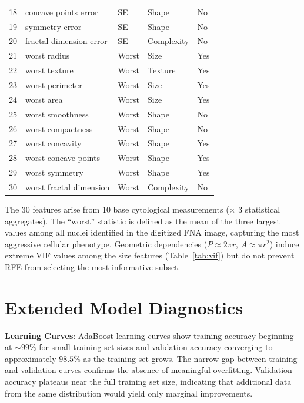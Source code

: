 \documentclass[10pt,letterpaper]{article}
\begin{document}
\begin{table}[h]
\begin{tabular}{rllll}
18 & concave points error    & SE   & Shape     & No  \\
19 & symmetry error          & SE   & Shape     & No  \\
20 & fractal dimension error & SE   & Complexity & No \\
21 & worst radius            & Worst & Size     & Yes \\
22 & worst texture           & Worst & Texture  & Yes \\
23 & worst perimeter         & Worst & Size     & Yes \\
24 & worst area              & Worst & Size     & Yes \\
25 & worst smoothness        & Worst & Shape    & No  \\
26 & worst compactness       & Worst & Shape    & No  \\
27 & worst concavity         & Worst & Shape    & Yes \\
28 & worst concave points    & Worst & Shape    & Yes \\
29 & worst symmetry          & Worst & Shape    & Yes \\
30 & worst fractal dimension & Worst & Complexity & No \\
\bottomrule
\end{tabular}
\end{table}

The 30 features arise from 10 base cytological measurements ($\times$ 3 statistical aggregates).
The ``worst'' statistic is defined as the mean of the three largest values among all nuclei
identified in the digitized FNA image, capturing the most aggressive cellular phenotype.
Geometric dependencies ($P \approx 2\pi r$, $A \approx \pi r^2$) induce extreme VIF values
among the size features (Table~\ref{tab:vif}) but do not prevent RFE from selecting the most
informative subset.

\section{Extended Model Diagnostics}

\textbf{Learning Curves}: AdaBoost learning curves show training accuracy beginning at $\sim 99\%$
for small training set sizes and validation accuracy converging to approximately $98.5\%$ as the
training set grows. The narrow gap between training and validation curves confirms the absence of
meaningful overfitting. Validation accuracy plateaus near the full training set size, indicating
that additional data from the same distribution would yield only marginal improvements.
\end{document}
